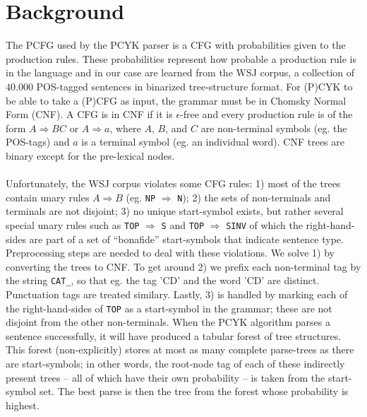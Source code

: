 \documentclass[11pt,twocolumn]{article}
\begin{document}
	\section{Background}\label{sec:background}
		The PCFG used by the PCYK parser is a CFG with probabilities given to the production
		rules. These probabilities represent how probable a production rule is in the language
		and in our case are learned from the WSJ corpus, a collection of $40.000$ POS-tagged
		sentences in binarized tree-structure format. For (P)CYK to be able to take a (P)CFG
		as input, the grammar must be in Chomsky Normal Form (CNF). A CFG is in CNF if it
		is $\epsilon$-free and every production rule is of the form $A \Rightarrow B C$ or
		$A \Rightarrow a$, where $A$, $B$, and $C$ are non-terminal symbols (eg. the POS-tags)
		and $a$ is a terminal symbol (eg. an individual word). CNF trees are binary except for
		the pre-lexical nodes.
		\\ \\
		Unfortunately, the WSJ corpus violates some CFG rules: 1) most of the trees contain
		unary rules $A \Rightarrow B$ (eg. \verb|NP| $\Rightarrow$ \verb|N|); 2) the sets
		of non-terminals and terminals are not disjoint; 3) no unique start-symbol exists,
		but rather several special unary rules such as \verb|TOP| $\Rightarrow$ \verb|S| and
		\verb|TOP| $\Rightarrow$ \verb|SINV| of which the right-hand-sides are part of a set of
		``bonafide'' start-symbols that indicate sentence type. Preprocessing steps are needed
		to deal with these violations. We solve 1) by converting the trees to CNF. To get around
		2) we prefix each non-terminal tag by the string \verb|CAT_|, so that eg. the tag 'CD'
		and the word 'CD' are distinct. Punctuation tags are treated similary. Lastly, 3) is
		handled by marking each of the right-hand-sides of \verb|TOP| as a start-symbol in
		the grammar; these are not disjoint from the other non-terminals. When the PCYK algorithm
		parses a sentence successfully, it will have produced a tabular forest of tree structures.
		This forest (non-explicitly) stores at most as many complete parse-trees as there are
		start-symbols; in other words, the root-node tag of each of these indirectly present
		trees -- all of which have their own probability -- is taken from the start-symbol set.
		The best parse is then the tree from the forest whose probability is highest.
		\\ \\
\end{document}
